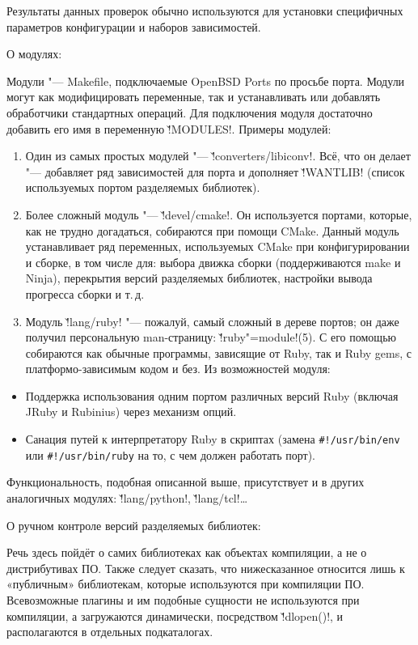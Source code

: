 \documentclass[10pt, a5paper]{article}
\begin{document}
Результаты данных проверок обычно используются для установки специфичных параметров конфигурации и наборов зависимостей.

О модулях:

Модули "--- Makefile, подключаемые OpenBSD Ports по просьбе порта. Модули могут как модифицировать переменные, так и устанавливать или добавлять обработчики стандартных операций. Для подключения модуля достаточно добавить его имя в переменную \v!MODULES!. Примеры модулей:

\begin{enumerate}
  \item Один из самых простых модулей "--- \v!converters/libiconv!. Всё, что он делает "--- добавляет ряд зависимостей для порта и дополняет \v!WANTLIB! (список используемых портом разделяемых библиотек).
  \item Более сложный модуль "--- \v!devel/cmake!. Он используется портами, которые, как не трудно догадаться, собираются при помощи CMake. Данный модуль устанавливает ряд переменных, используемых CMake при конфигурировании и сборке, в том числе для: выбора движка сборки (поддерживаются make и Ninja), перекрытия версий разделяемых библиотек, настройки вывода прогресса сборки и т.\,д.
  \item Модуль \v!lang/ruby! "--- пожалуй, самый сложный в дереве портов; он даже получил персональную man-страницу: \linebreak\v!ruby"=module!(5). С его помощью собираются как обычные программы, зависящие от Ruby, так и Ruby gems, с платформо-зависимым кодом и без. Из возможностей модуля:
\end{enumerate}

\begin{itemize}
  \item Поддержка использования одним портом различных версий Ruby (включая JRuby и Rubinius) через механизм опций.
  \item Санация путей к интерпретатору Ruby в скриптах (замена \texttt{\#!/usr/bin/env} или \texttt{\#!/usr/bin/ruby} на то, с чем должен работать порт).
\end{itemize}

Функциональность, подобная описанной выше, присутствует и в других аналогичных модулях: \v!lang/python!, \v!lang/tcl!\ldots{}

О ручном контроле версий разделяемых библиотек:

Речь здесь пойдёт о самих библиотеках как объектах компиляции, а не о дистрибутивах ПО. Также следует сказать, что нижесказанное относится лишь к «публичным» библиотекам, которые используются при компиляции ПО. Всевозможные плагины и им подобные сущности не используются при компиляции, а загружаются динамически, посредством \v!dlopen()!, и располагаются в отдельных подкаталогах.
\end{document}
